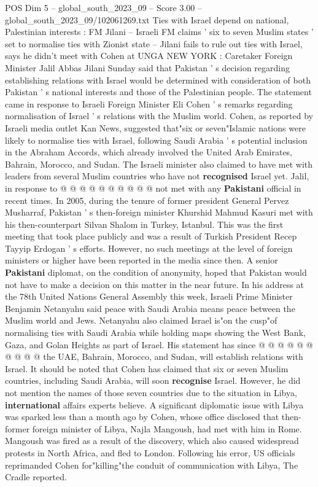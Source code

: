 \begin{textsample}{POS Dim 5 – global\_south\_2023\_09 – Score 3.00 – global\_south\_2023\_09/102061269.txt}  \label{ex:f5_pos_442}
Ties with Israel depend on national, Palestinian interests : FM Jilani -- Israeli FM claims ' six to seven Muslim states ' set to normalise ties with Zionist state -- Jilani fails to rule out ties with Israel, says he didn't meet with Cohen at UNGA NEW YORK : Caretaker Foreign Minister Jalil Abbas Jilani Sunday said that Pakistan ' s decision regarding establishing relations with Israel would be determined with consideration of both Pakistan ' s national interests and those of the Palestinian people.
The statement came in response to Israeli Foreign Minister Eli Cohen ' s remarks regarding normalisation of Israel ' s relations with the Muslim world.
Cohen, as reported by Israeli media outlet Kan News, suggested that"six or seven"Islamic nations were likely to normalise ties with Israel, following Saudi Arabia ' s potential inclusion in the Abraham Accords, which already involved the United Arab Emirates, Bahrain, Morocco, and Sudan.
The Israeli minister also claimed to have met with leaders from several Muslim countries who have not \textbf{recognised} Israel yet.
Jalil, in response to @ @ @ @ @ @ @ @ @ @ not met with any \textbf{Pakistani} official in recent times.
In 2005, during the tenure of former president General Pervez Musharraf, Pakistan ' s then-foreign minister Khurshid Mahmud Kasuri met with his then-counterpart Silvan Shalom in Turkey, Istanbul.
This was the first meeting that took place publicly and was a result of Turkish President Recep Tayyip Erdogan ' s efforts.
However, no such meetings at the level of foreign ministers or higher have been reported in the media since then.
A senior \textbf{Pakistani} diplomat, on the condition of anonymity, hoped that Pakistan would not have to make a decision on this matter in the near future.
In his address at the 78th United Nations General Assembly this week, Israeli Prime Minister Benjamin Netanyahu said peace with Saudi Arabia means peace between the Muslim world and Jews.
Netanyahu also claimed Israel is"on the cusp"of normalising ties with Saudi Arabia while holding maps showing the West Bank, Gaza, and Golan Heights as part of Israel.
His statement has since @ @ @ @ @ @ @ @ @ @ the UAE, Bahrain, Morocco, and Sudan, will establish relations with Israel.
It should be noted that Cohen has claimed that six or seven Muslim countries, including Saudi Arabia, will soon \textbf{recognise} Israel.
However, he did not mention the names of those seven countries due to the situation in Libya, \textbf{international} affairs experts believe.
A significant diplomatic issue with Libya was sparked less than a month ago by Cohen, whose office disclosed that then-former foreign minister of Libya, Najla Mangoush, had met with him in Rome.
Mangoush was fired as a result of the discovery, which also caused widespread protests in North Africa, and fled to London.
Following his error, US officials reprimanded Cohen for"killing"the conduit of communication with Libya, The Cradle reported.

\end{textsample}
